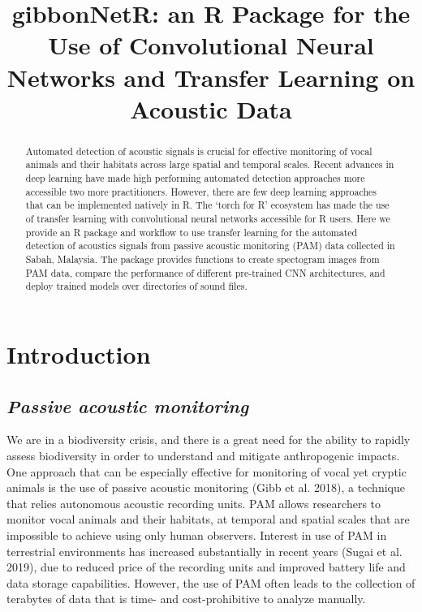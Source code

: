 \documentclass{article}
\title{gibbonNetR: an R Package for the Use of Convolutional Neural
Networks and Transfer Learning on Acoustic Data}
\author{
  }
\begin{document}
\maketitle


\begin{abstract}
Automated detection of acoustic signals is crucial for effective
monitoring of vocal animals and their habitats across large spatial and
temporal scales. Recent advances in deep learning have made high
performing automated detection approaches more accessible two more
practitioners. However, there are few deep learning approaches that can
be implemented natively in R. The `torch for R' ecosystem has made the
use of transfer learning with convolutional neural networks accessible
for R users. Here we provide an R package and workflow to use transfer
learning for the automated detection of acoustics signals from passive
acoustic monitoring (PAM) data collected in Sabah, Malaysia. The package
provides functions to create spectogram images from PAM data, compare
the performance of different pre-trained CNN architectures, and deploy
trained models over directories of sound files.
\end{abstract}


\hypertarget{introduction}{%
\section{Introduction}\label{introduction}}

\hypertarget{passive-acoustic-monitoring}{%
\subsection{\texorpdfstring{\emph{Passive acoustic
monitoring}}{Passive acoustic monitoring}}\label{passive-acoustic-monitoring}}

We are in a biodiversity crisis, and there is a great need for the
ability to rapidly assess biodiversity in order to understand and
mitigate anthropogenic impacts. One approach that can be especially
effective for monitoring of vocal yet cryptic animals is the use of
passive acoustic monitoring (Gibb et al. 2018), a technique that relies
autonomous acoustic recording units. PAM allows researchers to monitor
vocal animals and their habitats, at temporal and spatial scales that
are impossible to achieve using only human observers. Interest in use of
PAM in terrestrial environments has increased substantially in recent
years (Sugai et al. 2019), due to reduced price of the recording units
and improved battery life and data storage capabilities. However, the
use of PAM often leads to the collection of terabytes of data that is
time- and cost-prohibitive to analyze manually.
\end{document}
